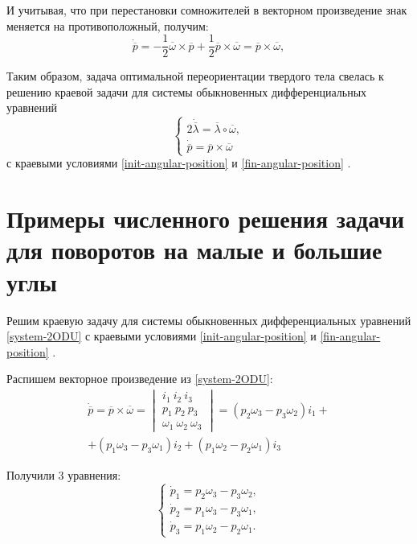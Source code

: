 \documentclass[14pt]{extreport}
\begin{document}
И учитывая, что при перестановки сомножителей в векторном произведение знак меняется на противоположный, получим:
\begin{equation}
\dot{\overline{p}}=-\dfrac{1}{2} \overline{\omega} \times \overline{p}+
\dfrac{1}{2} \overline{p} \times \overline{\omega} = \overline{p} \times \overline{\omega},
\end{equation}

Таким образом, задача оптимальной переориентации твердого тела све­лась к решению краевой задачи для системы обыкновенных дифференци­альных уравнений
\begin{equation}
\label{system-2ODU}
\begin{cases}
	2\dot{\overline{\lambda}} = \overline{\lambda} \circ \overline{\omega},\\
	\dot{\overline{p}} = \overline{p} \times \overline{\omega}
\end{cases}
\end{equation}
с краевыми условиями \eqref{init-angular-position} и \eqref{fin-angular-position} \cite{mechanics}.

\chapter{Примеры численного решения задачи для поворотов на малые и большие углы}
Решим краевую задачу для системы обыкновенных дифференци­альных уравнений \eqref{system-2ODU} с краевыми условиями \eqref{init-angular-position} и \eqref{fin-angular-position} \cite{antipova}.

Распишем векторное произведение из \eqref{system-2ODU}:
\begin{equation}
\begin{split}
\dot{\overline{p}}=\overline{p} \times \overline{\omega} =
\begin{vmatrix}
  i_{1}\ i_{2}\ i_{3}\\
  p_{1}\ p_{2}\ p_{3}\\
  \omega_{1}\ \omega_{2}\ \omega_{3}
\end{vmatrix}=
(p_2 \omega_3 - p_3 \omega_2)i_1 +\\
+ (p_1 \omega_3 - p_3 \omega_1)i_2 + (p_1 \omega_2 - p_2 \omega_1)i_3
\end{split}
\end{equation}

Получили 3 уравнения:
\begin{equation}
\begin{cases}
\dot{p}_1 = p_2 \omega_3 - p_3 \omega_2,\\
\dot{p}_2 = p_1 \omega_3 - p_3 \omega_1,\\
\dot{p}_3 = p_1 \omega_2 - p_2 \omega_1.
\end{cases}
\end{equation}
\end{document}
